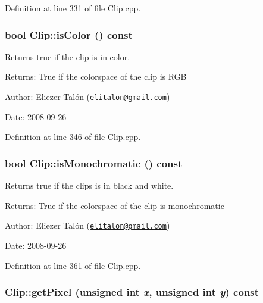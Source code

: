 Definition at line 331 of file Clip.cpp.\hypertarget{class_clip_0a535167abd0a544a2de56c317bb6f3c}{
\subsubsection[isColor]{\setlength{\rightskip}{0pt plus 5cm}bool Clip::isColor () const}}
\label{class_clip_0a535167abd0a544a2de56c317bb6f3c}


Returns true if the clip is in color. 

\begin{Desc}
\item[Returns:]True if the colorspace of the clip is RGB\end{Desc}
\begin{Desc}
\item[Author:]Eliezer Talón (\href{mailto:elitalon@gmail.com}{\tt elitalon@gmail.com}) \end{Desc}
\begin{Desc}
\item[Date:]2008-09-26 \end{Desc}


Definition at line 346 of file Clip.cpp.\hypertarget{class_clip_5045f79876d4299b54803d56b26d5f75}{
\subsubsection[isMonochromatic]{\setlength{\rightskip}{0pt plus 5cm}bool Clip::isMonochromatic () const}}
\label{class_clip_5045f79876d4299b54803d56b26d5f75}


Returns true if the clips is in black and white. 

\begin{Desc}
\item[Returns:]True if the colorspace of the clip is monochromatic\end{Desc}
\begin{Desc}
\item[Author:]Eliezer Talón (\href{mailto:elitalon@gmail.com}{\tt elitalon@gmail.com}) \end{Desc}
\begin{Desc}
\item[Date:]2008-09-26 \end{Desc}


Definition at line 361 of file Clip.cpp.\hypertarget{class_clip_74eded11c0dcbd2b10b453074cbb8b84}{
\subsubsection[getPixel]{ Clip::getPixel (unsigned int {\em x}, \/  unsigned int {\em y}) const}}
\label{class_clip_74eded11c0dcbd2b10b453074cbb8b84}


